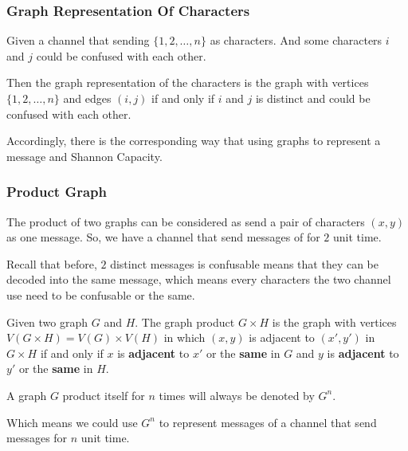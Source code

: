\begin{frame}
      \frametitle{Graph Representation Of Characters}
      \begin{definition}\label{def:graphRepresetationOfChannel}
            Given a channel that sending $\{1,2,\dots,n\}$ as characters. And some characters $i$ and $j$ could be confused with each other.

            \smallskip

            Then the graph representation of the characters is the graph with vertices $\{1,2,\dots,n\}$ and edges $(i,j)$ if and only if $i$ and $j$ is distinct and could be confused with each other.
      \end{definition}

      Accordingly, there is the corresponding way that using graphs to represent a message and Shannon Capacity.
\end{frame}

\begin{frame}
      \frametitle{Product Graph}
      \begin{definition}\label{def:graphProduct}
            The product of two graphs can be considered as send a pair of characters $(x,y)$ as one message. So, we have a channel that send messages of for $2$ unit time.

            \pause
            \smallskip

            Recall that before, $2$ distinct messages is confusable means that they can be decoded into the same message, which means every characters the two channel use need to be confusable or the same.

            \smallskip

            Given two graph $ G $ and $ H $. The graph product $ G \times H $ is the graph with vertices $ V(G \times H) = V(G) \times V(H) $ in which $ (x,y) $ is adjacent to $ (x',y') $ in $ G \times H $ if and only if $ x $ is \textbf{adjacent} to $ x' $ or the \textbf{same} in $ G $ and $ y $ is \textbf{adjacent} to $ y' $ or the \textbf{same} in $ H $.

            \pause

            A graph $ G $ product itself for $ n $ times will always be denoted by $ G^n $.

            Which means we could use $ G^n $ to represent messages of a channel that send messages for $n$ unit time.
      \end{definition}
\end{frame}

